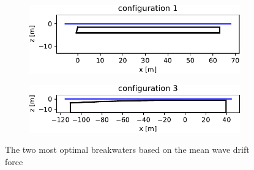 \begin{figure}[h]
    \centering
    \begin{subfigure}[b]{0.49\textwidth}
        \centering
        \includegraphics[width=\textwidth]{figures/ComFLOW/Breakwater Geometries/Design Iteration 1 captive/top6 low Fd/breakwater_geometry1.pdf}
        \caption[]%
        {{\small}}    
        \label{fig: opt breakwater 1 FD DI1 H3 captive}
    \end{subfigure}
    \hfill
    \begin{subfigure}[b]{0.49\textwidth}  
        \centering 
        \includegraphics[width=\textwidth]{figures/ComFLOW/Breakwater Geometries/Design Iteration 1 captive/top6 low Fd/breakwater_geometry3.pdf}
        \caption[]%
        {{\small}}    
        \label{fig: opt breakwater 2 FD DI1 H3 captive}
    \end{subfigure}
    
    \caption{The two most optimal breakwaters based on the mean wave drift force}
    \label{fig: two most optimal breakwaters FD DI1 H3 captive}
\end{figure}


